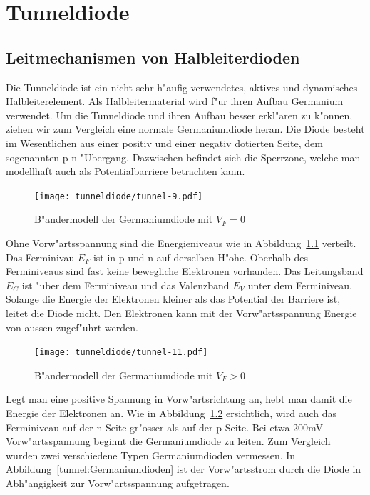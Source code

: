 
\chapter{Tunneldiode\label{chapter:tunneldiode}}
\begin{refsection}

\section{Leitmechanismen von Halbleiterdioden}

Die Tunneldiode ist ein nicht sehr h"aufig verwendetes, aktives und dynamisches Halbleiterelement.
%
Als Halbleitermaterial wird f"ur ihren  Aufbau Germanium verwendet. 
%
Um die Tunneldiode und ihren Aufbau besser erkl"aren zu k"onnen, ziehen wir zum Vergleich eine normale Germaniumdiode heran. 
Die Diode besteht im Wesentlichen aus einer positiv und einer negativ dotierten Seite, dem sogenannten p-n-"Ubergang. 
%
Dazwischen befindet sich die Sperrzone, welche man modellhaft auch als Potentialbarriere betrachten kann.

\begin{figure}	%
\centering
\texttt{[image: tunneldiode/tunnel-9.pdf]}
\caption{B"andermodell der Germaniumdiode mit $V_F = 0$
\label{tunnel:BaendermodellG0}}
\end{figure}

Ohne Vorw"artsspannung sind die Energieniveaus wie in Abbildung~\ref{tunnel:BaendermodellG0} verteilt. 
Das Ferminivau $E_F$ ist in p und n auf derselben H"ohe.
Oberhalb des Ferminiveaus sind fast keine bewegliche Elektronen vorhanden.
Das Leitungsband $E_C$ ist "uber dem Ferminiveau  und das Valenzband $E_V$ unter dem Ferminiveau. 
Solange die Energie der Elektronen kleiner als das Potential der Barriere ist, leitet die Diode nicht.
Den Elektronen kann mit der Vorw"artsspannung Energie von aussen zugef"uhrt werden.

\begin{figure}	%
\centering
\texttt{[image: tunneldiode/tunnel-11.pdf]}
\caption{B"andermodell der Germaniumdiode mit $V_F > 0$
\label{tunnel:BaendermodellG}}
\end{figure}

Legt man eine positive Spannung in Vorw"artsrichtung an, hebt man damit die Energie der Elektronen an. 
Wie in Abbildung~\ref{tunnel:BaendermodellG} ersichtlich, wird auch das Ferminiveau auf der n-Seite gr"osser als auf der p-Seite. 
Bei etwa 200mV Vorw"artsspannung beginnt die Germaniumdiode zu leiten. 
Zum Vergleich wurden zwei verschiedene Typen Germaniumdioden vermessen. 
In Abbildung~\ref{tunnel:Germaniumdioden} ist der Vorw"artsstrom durch die Diode in Abh"angigkeit zur Vorw"artsspannung aufgetragen.


\end{refsection}
